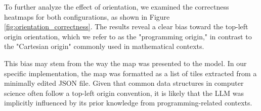 To further analyze the effect of orientation, we examined the correctness
heatmaps for both configurations, as shown in Figure \ref{fig:orientation_correctness}.
The results reveal a clear bias toward the top-left origin orientation, which we
refer to as the "programming origin," in contrast to the "Cartesian origin"
commonly used in mathematical contexts.

This bias may stem from the way the map was presented to the model. In our specific
implementation, the map was formatted as a list of tiles extracted from a
minimally edited JSON file. Given that common data structures in computer science
often follow a top-left origin convention, it is likely that the LLM was
implicitly influenced by its prior knowledge from programming-related contexts.

\vspace{5mm}
